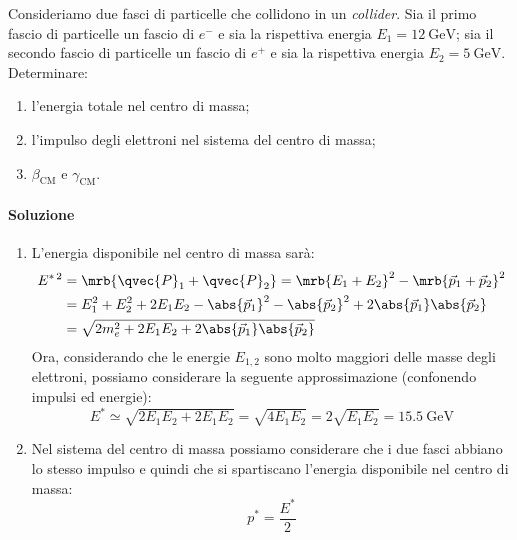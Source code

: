 \begin{example}[]
  Consideriamo due fasci di particelle che collidono in un \textit{collider}.
  Sia il primo fascio di particelle un fascio di $e^-$ e sia la rispettiva
  energia $E _{1} = \qty{12}{\GeV}$; sia il secondo fascio di particelle un
  fascio di $e^+$ e sia la rispettiva energia $E _{2} = \qty{5}{\GeV}$.
  Determinare:
  \begin{enumerate}
    \item l'energia totale nel centro di massa;
    \item l'impulso degli elettroni nel sistema del centro di massa;
    \item $\beta _\text{CM}$ e $\gamma _\text{CM}$.
  \end{enumerate}

  \paragraph{Soluzione}
  \begin{enumerate}
    \item L'energia disponibile nel centro di massa sarà:
      \begin{align*}
        E ^{\ast\,2} &= \mrb{\qvec{P}_{1} + \qvec{P}_{2}} = \mrb{E_1 + E_2} ^{2}
        - \mrb{\vec{p}_{1} + \vec{p}_{2}}^{2}
        \\
        &= E_1^2 + E_2^2 + 2 E_1 E_2 -
        \abs{\vec{p}_{1}}^{2} - \abs{\vec{p}_{2}}^{2} + 2 \abs{\vec{p}_{1}}
        \abs{\vec{p}_{2}}
        \\
        &= \sqrt{2 m_e^2 + 2 E_1 E_2 + 2 \abs{\vec{p}_{1}} \abs{\vec{p}_{2}}}
      \end{align*}
      Ora, considerando che le energie $E_{1,2}$ sono molto maggiori delle
      masse degli elettroni, possiamo considerare la seguente approssimazione
      (confonendo impulsi ed energie):
      \begin{equation}
        E ^{\ast} \simeq \sqrt{2 E_1 E_2 + 2 E_1 E_2} = \sqrt{4 E_1 E_2} = 2
        \sqrt{E_1 E_2} = \qty{15.5}{\GeV}
      \end{equation}

    \item Nel sistema del centro di massa possiamo considerare che i due fasci
      abbiano lo stesso impulso e quindi che si spartiscano l'energia
      disponibile nel centro di massa:
      \begin{equation}
        p ^{\ast} = \frac{E ^{\ast}}{2}
      \end{equation}


\end{enumerate}
\end{example}
